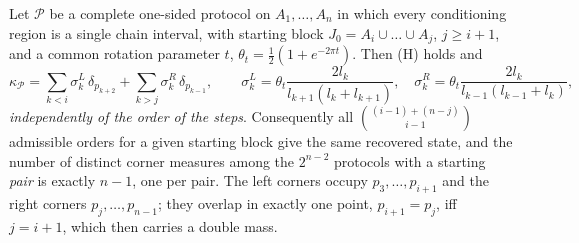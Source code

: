 \documentclass[11pt]{article}
\newcommand{\PP}{\mathcal P}
\theoremstyle{definition}\newtheorem{example}[theorem]{Example}
\begin{document}
\begin{proposition}\label{prop:startblock}
Let $\PP$ be a complete one-sided protocol on $A_1,\dots,A_n$ in which every conditioning region
is a single chain interval, with starting block $J_0=A_i\cup\dots\cup A_j$, $j\ge i+1$, and a
common rotation parameter $t$, $\theta_t=\frac12(1+e^{-2\pi t})$.  Then (H) holds and
\begin{equation}\label{eq:startblock}
 \kappa_\PP=\sum_{k<i}\sigma^L_k\,\delta_{p_{k+2}}+\sum_{k>j}\sigma^R_k\,\delta_{p_{k-1}},
 \qquad
 \sigma^L_k=\theta_t\frac{2l_k}{l_{k+1}(l_k+l_{k+1})},\quad
 \sigma^R_k=\theta_t\frac{2l_k}{l_{k-1}(l_{k-1}+l_k)} ,
\end{equation}
\emph{independently of the order of the steps}.  Consequently all $\binom{(i-1)+(n-j)}{i-1}$
admissible orders for a given starting block give the same recovered state, and the number of distinct corner measures
among the $2^{n-2}$ protocols with a starting \emph{pair} is exactly $n-1$, one per pair.  The
left corners occupy $p_3,\dots,p_{i+1}$ and the right corners $p_j,\dots,p_{n-1}$; they overlap
in exactly one point, $p_{i+1}=p_j$, iff $j=i+1$, which then carries a double mass.
\end{proposition}
\end{document}
